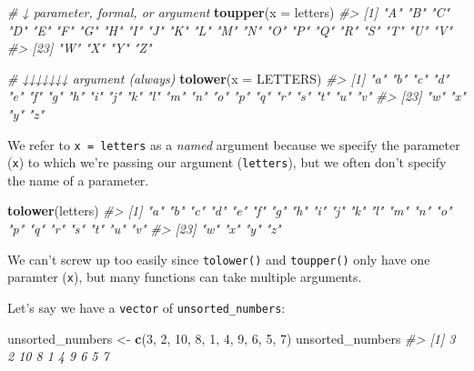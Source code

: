 \documentclass[
]{report}
\newenvironment{Shaded}{\begin{snugshade}}{\end{snugshade}}
\newcommand{\CommentTok}[1]{\textcolor[rgb]{0.56,0.35,0.01}{\textit{#1}}}
\newcommand{\DataTypeTok}[1]{\textcolor[rgb]{0.13,0.29,0.53}{#1}}
\newcommand{\DecValTok}[1]{\textcolor[rgb]{0.00,0.00,0.81}{#1}}
\newcommand{\KeywordTok}[1]{\textcolor[rgb]{0.13,0.29,0.53}{\textbf{#1}}}
\newcommand{\NormalTok}[1]{#1}
\newcommand{\StringTok}[1]{\textcolor[rgb]{0.31,0.60,0.02}{#1}}
\begin{document}
\begin{Shaded}
\begin{Highlighting}[]
\CommentTok{\#       ↓ parameter, formal, or argument }
\KeywordTok{toupper}\NormalTok{(}\DataTypeTok{x =}\NormalTok{ letters)}
\CommentTok{\#\textgreater{}  [1] "A" "B" "C" "D" "E" "F" "G" "H" "I" "J" "K" "L" "M" "N" "O" "P" "Q" "R" "S" "T" "U" "V"}
\CommentTok{\#\textgreater{} [23] "W" "X" "Y" "Z"}

\CommentTok{\#           ↓↓↓↓↓↓↓ argument (always)}
\KeywordTok{tolower}\NormalTok{(}\DataTypeTok{x =}\NormalTok{ LETTERS)}
\CommentTok{\#\textgreater{}  [1] "a" "b" "c" "d" "e" "f" "g" "h" "i" "j" "k" "l" "m" "n" "o" "p" "q" "r" "s" "t" "u" "v"}
\CommentTok{\#\textgreater{} [23] "w" "x" "y" "z"}
\end{Highlighting}
\end{Shaded}

We refer to \texttt{x\ =\ letters} as a \emph{named} argument because we specify the parameter (\texttt{x}) to which we're passing our argument (\texttt{letters}), but we often don't specify the name of a parameter.

\begin{Shaded}
\begin{Highlighting}[]
\KeywordTok{tolower}\NormalTok{(letters)}
\CommentTok{\#\textgreater{}  [1] "a" "b" "c" "d" "e" "f" "g" "h" "i" "j" "k" "l" "m" "n" "o" "p" "q" "r" "s" "t" "u" "v"}
\CommentTok{\#\textgreater{} [23] "w" "x" "y" "z"}
\end{Highlighting}
\end{Shaded}

We can't screw up too easily since \texttt{tolower()} and \texttt{toupper()} only have one paramter (\texttt{x}), but many functions can take multiple arguments.

Let's say we have a \texttt{vector} of \texttt{unsorted\_numbers}:

\begin{Shaded}
\begin{Highlighting}[]
\NormalTok{unsorted\_numbers \textless{}{-}}\StringTok{ }\KeywordTok{c}\NormalTok{(}\DecValTok{3}\NormalTok{, }\DecValTok{2}\NormalTok{, }\DecValTok{10}\NormalTok{, }\DecValTok{8}\NormalTok{, }\DecValTok{1}\NormalTok{, }\DecValTok{4}\NormalTok{, }\DecValTok{9}\NormalTok{, }\DecValTok{6}\NormalTok{, }\DecValTok{5}\NormalTok{, }\DecValTok{7}\NormalTok{)}
\NormalTok{unsorted\_numbers}
\CommentTok{\#\textgreater{}  [1]  3  2 10  8  1  4  9  6  5  7}
\end{Highlighting}
\end{Shaded}
\end{document}
